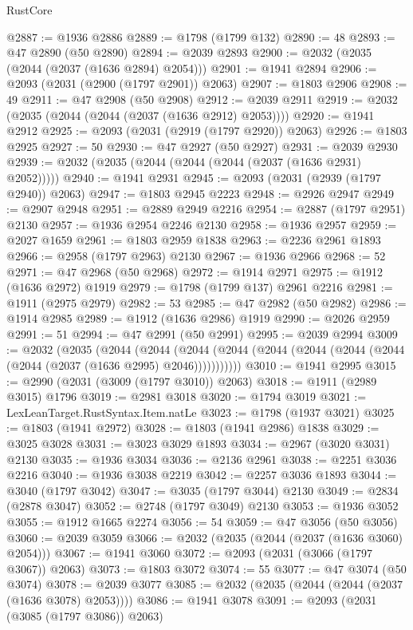 \begin{lexlean}{RustCore}
\begin{coremodule}
@2887 := @1936 @2886
@2889 := @1798 (@1799 @132)
@2890 := 48
@2893 := @47 @2890 (@50 @2890)
@2894 := @2039 @2893
@2900 := @2032 (@2035 (@2044 (@2037 (@1636 @2894) @2054)))
@2901 := @1941 @2894
@2906 := @2093 (@2031 (@2900 (@1797 @2901)) @2063)
@2907 := @1803 @2906
@2908 := 49
@2911 := @47 @2908 (@50 @2908)
@2912 := @2039 @2911
@2919 := @2032 (@2035 (@2044 (@2044 (@2037 (@1636 @2912) @2053))))
@2920 := @1941 @2912
@2925 := @2093 (@2031 (@2919 (@1797 @2920)) @2063)
@2926 := @1803 @2925
@2927 := 50
@2930 := @47 @2927 (@50 @2927)
@2931 := @2039 @2930
@2939 := @2032 (@2035 (@2044 (@2044 (@2044 (@2037 (@1636 @2931) @2052)))))
@2940 := @1941 @2931
@2945 := @2093 (@2031 (@2939 (@1797 @2940)) @2063)
@2947 := @1803 @2945 @2223
@2948 := @2926 @2947
@2949 := @2907 @2948
@2951 := @2889 @2949 @2216
@2954 := @2887 (@1797 @2951) @2130
@2957 := @1936 @2954 @2246 @2130
@2958 := @1936 @2957
@2959 := @2027 @1659
@2961 := @1803 @2959 @1838
@2963 := @2236 @2961 @1893
@2966 := @2958 (@1797 @2963) @2130
@2967 := @1936 @2966
@2968 := 52
@2971 := @47 @2968 (@50 @2968)
@2972 := @1914 @2971
@2975 := @1912 (@1636 @2972) @1919
@2979 := @1798 (@1799 @137) @2961 @2216
@2981 := @1911 (@2975 @2979)
@2982 := 53
@2985 := @47 @2982 (@50 @2982)
@2986 := @1914 @2985
@2989 := @1912 (@1636 @2986) @1919
@2990 := @2026 @2959
@2991 := 51
@2994 := @47 @2991 (@50 @2991)
@2995 := @2039 @2994
@3009 := @2032
    (@2035
      (@2044
        (@2044
          (@2044 (@2044 (@2044 (@2044 (@2044 (@2044 (@2044 (@2037 (@1636 @2995) @2046)))))))))))
@3010 := @1941 @2995
@3015 := @2990 (@2031 (@3009 (@1797 @3010)) @2063)
@3018 := @1911 (@2989 @3015) @1796
@3019 := @2981 @3018
@3020 := @1794 @3019
@3021 := LexLeanTarget.RustSyntax.Item.natLe
@3023 := @1798 (@1937 @3021)
@3025 := @1803 (@1941 @2972)
@3028 := @1803 (@1941 @2986) @1838
@3029 := @3025 @3028
@3031 := @3023 @3029 @1893
@3034 := @2967 (@3020 @3031) @2130
@3035 := @1936 @3034
@3036 := @2136 @2961
@3038 := @2251 @3036 @2216
@3040 := @1936 @3038 @2219
@3042 := @2257 @3036 @1893
@3044 := @3040 (@1797 @3042)
@3047 := @3035 (@1797 @3044) @2130
@3049 := @2834 (@2878 @3047)
@3052 := @2748 (@1797 @3049) @2130
@3053 := @1936 @3052
@3055 := @1912 @1665 @2274
@3056 := 54
@3059 := @47 @3056 (@50 @3056)
@3060 := @2039 @3059
@3066 := @2032 (@2035 (@2044 (@2037 (@1636 @3060) @2054)))
@3067 := @1941 @3060
@3072 := @2093 (@2031 (@3066 (@1797 @3067)) @2063)
@3073 := @1803 @3072
@3074 := 55
@3077 := @47 @3074 (@50 @3074)
@3078 := @2039 @3077
@3085 := @2032 (@2035 (@2044 (@2044 (@2037 (@1636 @3078) @2053))))
@3086 := @1941 @3078
@3091 := @2093 (@2031 (@3085 (@1797 @3086)) @2063)

\end{coremodule}
\end{lexlean}
